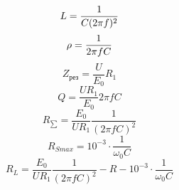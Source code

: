 \documentclass{article}
\begin{document}
\begin{equation}\label{}
L=\frac{1}{C(2\pi f)^2} \\
\end{equation}
\begin{equation}\label{}
\rho=\frac{1}{2\pi fC} \\
\end{equation}
\begin{equation}\label{}
Z_{\text{рез}}=\frac{U}{E_0}R_1
\end{equation}
\begin{equation}\label{}
Q=\frac{UR_1}{E_0}2\pi fC
\end{equation}
\begin{equation}\label{}
R_{\sum}=\frac{E_0}{UR_1}\frac{1}{(2\pi fC)^2}
\end{equation}
\begin{equation}\label{}
R_{Smax}=10^{-3}\cdot\frac{1}{\omega_0C}
\end{equation}
\begin{equation}\label{}
R_L=\frac{E_0}{UR_1}\frac{1}{(2\pi fC)^2}-R-10^{-3}\cdot\frac{1}{\omega_0C}
\end{equation}
\end{document}
